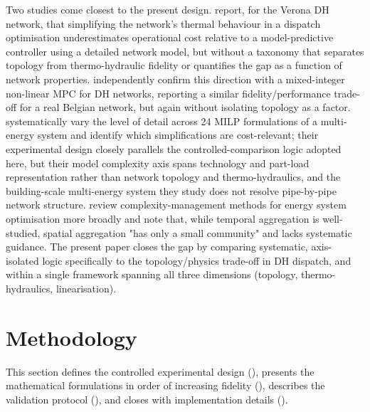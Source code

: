 \documentclass[a4paper,fleqn]{cas-dc}
\begin{document}
Two studies come closest to the present design. \citet{Quaggiotto2021}
report, for the Verona DH network, that simplifying the network's
thermal behaviour in a dispatch optimisation  underestimates
operational cost relative to a model-predictive controller using a
detailed network model, but without a taxonomy that separates topology from
thermo-hydraulic fidelity or quantifies the gap as a function of
network properties. \citet{Jansen2024} independently confirm this
direction with a mixed-integer non-linear MPC for DH networks,
reporting a similar fidelity/performance trade-off for a real
Belgian network, but again without isolating topology as a factor.
\citet{Wirtz2021_complexity} systematically vary
the level of detail across 24 MILP formulations of a multi-energy
system and identify which simplifications are cost-relevant; their
experimental design closely parallels the controlled-comparison logic
adopted here, but their model complexity axis spans technology and
part-load representation rather than network topology and
thermo-hydraulics, and the building-scale multi-energy system they
study does not resolve pipe-by-pipe network structure. \citet{Kotzur2021}
review complexity-management methods for energy system optimisation 
more broadly and note that, while temporal aggregation is
well-studied, spatial aggregation "has only a small community" and
lacks systematic guidance. The present
paper closes the gap by comparing
systematic, axis-isolated logic specifically to the topology/physics
trade-off in DH dispatch, and within a single
framework spanning all three dimensions (topology, thermo-hydraulics,
linearisation).


\section{Methodology}
\label{sec:methodology}

This section defines the controlled experimental design
(), presents the mathematical formulations in
order of increasing fidelity (),
describes the validation protocol (), and
closes with implementation details ().
\end{document}
